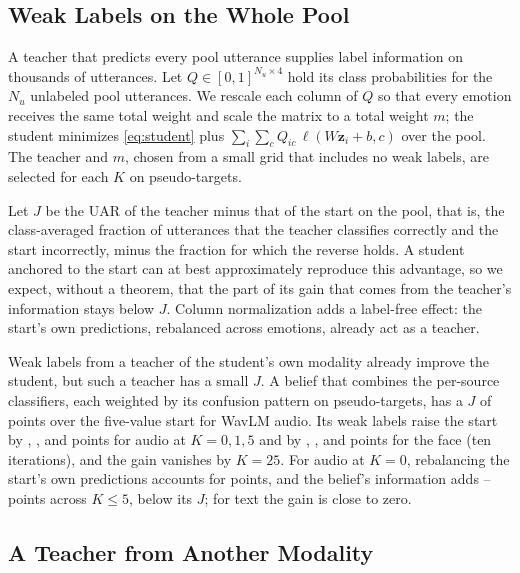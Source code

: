 \subsection{Weak Labels on the Whole Pool}
\label{sec:part2-weak}

A teacher that predicts every pool utterance supplies label information on thousands of utterances.
Let $Q \in [0,1]^{N_u \times 4}$ hold its class probabilities for the $N_u$ unlabeled pool utterances.
We rescale each column of $Q$ so that every emotion receives the same total weight and scale the matrix to a total weight $m$; the student minimizes \eqref{eq:student} plus $\sum_{i}\sum_{c} Q_{ic}\,\ell(W\mathbf{z}_i + b, c)$ over the pool.
The teacher and $m$, chosen from a small grid that includes no weak labels, are selected for each $K$ on pseudo-targets.

Let $J$ be the UAR of the teacher minus that of the start on the pool, that is, the class-averaged fraction of utterances that the teacher classifies correctly and the start incorrectly, minus the fraction for which the reverse holds.
A student anchored to the start can at best approximately reproduce this advantage, so we expect, without a theorem, that the part of its gain that comes from the teacher's information stays below $J$.
Column normalization adds a label-free effect: the start's own predictions, rebalanced across emotions, already act as a teacher.

Weak labels from a teacher of the student's own modality already improve the student, but such a teacher has a small $J$.
A belief that combines the per-source classifiers, each weighted by its confusion pattern on pseudo-targets, has a $J$ of  points over the five-value start for WavLM audio.
Its weak labels raise the start by , , and  points for audio at $K = 0, 1, 5$ and by , , and  points for the face (ten iterations), and the gain vanishes by $K=25$.
For audio at $K=0$, rebalancing the start's own predictions accounts for  points, and the belief's information adds -- points across $K \le 5$, below its $J$; for text the gain is close to zero.

\subsection{A Teacher from Another Modality}
\label{sec:part2-crossmodal}

